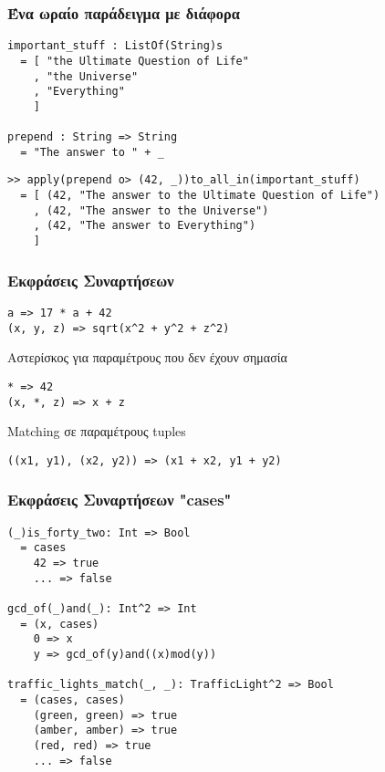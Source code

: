 \documentclass{beamer}
\def\e{\foreignlanguage{english}}
\begin{document}
\begin{frame}[fragile]

\frametitle{Ένα ωραίο παράδειγμα με διάφορα}


\begin{otherlanguage}{english}
\begin{verbatim}
important_stuff : ListOf(String)s
  = [ "the Ultimate Question of Life"
    , "the Universe"
    , "Everything"
    ]

prepend : String => String
  = "The answer to " + _
\end{verbatim}

\begin{verbatim}
>> apply(prepend o> (42, _))to_all_in(important_stuff)
  = [ (42, "The answer to the Ultimate Question of Life")
    , (42, "The answer to the Universe")
    , (42, "The answer to Everything")
    ]
\end{verbatim}
\end{otherlanguage}

\end{frame}

\begin{frame}[fragile]

\frametitle{Εκφράσεις Συναρτήσεων}

\begin{otherlanguage}{english}
\begin{verbatim}
a => 17 * a + 42
(x, y, z) => sqrt(x^2 + y^2 + z^2)
\end{verbatim}
\end{otherlanguage}
Αστερίσκος για παραμέτρους που δεν έχουν σημασία
\begin{otherlanguage}{english}
\begin{verbatim}
* => 42
(x, *, z) => x + z
\end{verbatim}
\end{otherlanguage}
\e{Matching} σε παραμέτρους \e{tuples}
\begin{otherlanguage}{english}
\begin{verbatim}
((x1, y1), (x2, y2)) => (x1 + x2, y1 + y2)
\end{verbatim}
\end{otherlanguage}

\end{frame}

\begin{frame}[fragile]

\frametitle{Εκφράσεις Συναρτήσεων \e{"cases"}}

\begin{otherlanguage}{english}
\begin{verbatim}
(_)is_forty_two: Int => Bool
  = cases
    42 => true
    ... => false

gcd_of(_)and(_): Int^2 => Int
  = (x, cases)
    0 => x
    y => gcd_of(y)and((x)mod(y))

traffic_lights_match(_, _): TrafficLight^2 => Bool
  = (cases, cases)
    (green, green) => true
    (amber, amber) => true
    (red, red) => true
    ... => false
\end{verbatim}
\end{otherlanguage}

\end{frame}
\end{document}
